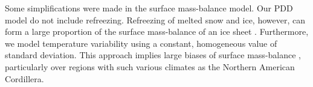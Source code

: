 Some simplifications were made in the surface mass-balance model. Our PDD model do not include refreezing. Refreezing of melted snow and ice, however, can form a large proportion of the surface mass-balance of an ice sheet \citep{janssens-huybrechts-2000}. Furthermore, we model temperature variability using a constant, homogeneous value of standard deviation. This approach implies large biases of surface mass-balance \citep{charbit-etal-2013,rau-rogozhina-2013,seguinot-inreview}, particularly over regions with such various climates as the Northern American Cordillera.


